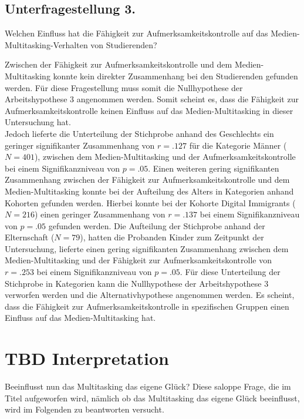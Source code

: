 \subsection{Unterfragestellung 3.} Welchen Einfluss hat die Fähigkeit zur Aufmerksamkeitskontrolle auf das Medien-Multitasking-Verhalten von Studierenden?

Zwischen der Fähigkeit zur Aufmerksamkeitskontrolle und dem Medien-Multitasking konnte kein direkter Zusammenhang bei den Studierenden gefunden werden. Für diese Fragestellung muss somit die Nullhypothese der Arbeitshypothese 3 angenommen werden. Somit scheint es, dass die Fähigkeit zur Aufmerksamkeitskontrolle keinen Einfluss auf das Medien-Multitasking in dieser Untersuchung hat. \\
Jedoch lieferte die Unterteilung der Stichprobe anhand des Geschlechts ein geringer signifikanter Zusammenhang von $r=.127$ für die Kategorie Männer ($N=401$), zwischen dem Medien-Multitasking und der Aufmerksamkeitskontrolle bei einem Signifikanzniveau von $p=.05$. Einen weiteren gering signifikanten Zusammenhang zwischen der Fähigkeit zur Aufmerksamkeitskontrolle und dem Medien-Multitasking konnte bei der Aufteilung des Alters in Kategorien anhand Kohorten gefunden werden. Hierbei konnte bei der Kohorte Digital Immigrants ($N=216$) einen geringer Zusammenhang von $r=.137$ bei einem Signifikanzniveau von $p=.05$ gefunden werden. Die Aufteilung der Stichprobe anhand der Elternschaft ($N=79$), hatten die Probanden Kinder zum Zeitpunkt der Untersuchung, lieferte einen gering signifikanten Zusammenhang zwischen dem Medien-Multitasking und der Fähigkeit zur Aufmerksamkeitskontrolle von $r=.253$ bei einem Signifikanzniveau von $p=.05$. Für diese Unterteilung der Stichprobe in Kategorien kann die Nullhypothese der Arbeitshypothese 3 verworfen werden und die Alternativhypothese angenommen werden. Es scheint, dass die Fähigkeit zur Aufmerksamkeitskontrolle in spezifischen Gruppen einen Einfluss auf das Medien-Multitasking hat.

\section{TBD Interpretation}\label{section.diskussion.interpretation}
Beeinflusst nun das Multitasking das eigene Glück? Diese saloppe Frage, die im Titel aufgeworfen wird, nämlich ob das Multitasking das eigene Glück beeinflusst, wird im Folgenden zu beantworten versucht. 
